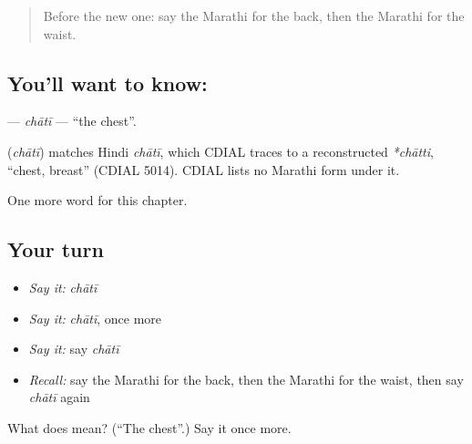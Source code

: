 \begin{quote}
Before the new one: say the Marathi for the back, then the Marathi for the waist.
\end{quote}

\subsection*{You'll want to know: }
\textbf{} — \emph{chātī} — \textquotedblleft{}the chest\textquotedblright{}.

\begin{cousinweb}
\textbf{} (\emph{chātī}) matches Hindi \emph{chātī}, which CDIAL traces to a reconstructed \emph{*chātti}, \textquotedblleft{}chest, breast\textquotedblright{} (CDIAL 5014). CDIAL lists no Marathi form under it.
\end{cousinweb}

\begin{grammarlens}[title={What you've built}]
One more word for this chapter.
\end{grammarlens}

\subsection*{Your turn}
\begin{itemize}
\raggedright
  \item \emph{Say it:} \emph{chātī}
  \item \emph{Say it:} \emph{chātī}, once more
  \item \emph{Say it:} say \emph{chātī}
  \item \emph{Recall:} say the Marathi for the back, then the Marathi for the waist, then say \emph{chātī} again
\end{itemize}

\begin{tcolorbox}[breakable,colback=teal!4,colframe=teal!35!black,title={Before you move on}]
What does  mean? (\textquotedblleft{}The chest\textquotedblright{}.) Say it once more.
\end{tcolorbox}
